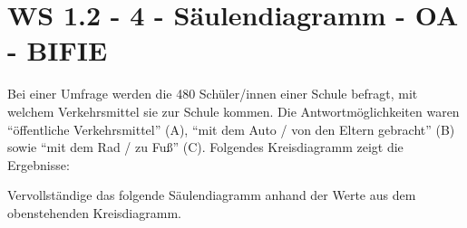 \section{WS 1.2 - 4 - Säulendiagramm - OA - BIFIE}

\begin{beispiel}[WS 1.2]{1} %
				Bei einer Umfrage werden die 480 Schüler/innen einer Schule befragt, mit welchem Verkehrsmittel
sie zur Schule kommen. Die Antwortmöglichkeiten waren "`öffentliche Verkehrsmittel"' (A),
"`mit dem Auto / von den Eltern gebracht"' (B) sowie "`mit dem Rad / zu Fuß"' (C). Folgendes
Kreisdiagramm zeigt die Ergebnisse:\\

\begin{center}
\end{center}


Vervollständige das folgende Säulendiagramm anhand der Werte aus dem obenstehenden Kreisdiagramm.\\


\end{beispiel}
